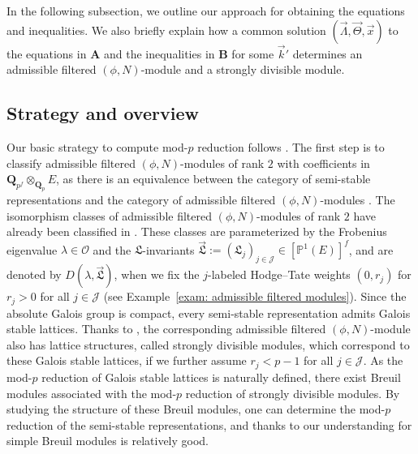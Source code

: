 \documentclass[11pt]{amsart}
\theoremstyle{definition}
\numberwithin{equation}{subsection}
\theoremstyle{plain}
\theoremstyle{plain}
\theoremstyle{plain}
\theoremstyle{plain}
\theoremstyle{plain}
\theoremstyle{plain}
\theoremstyle{plain}
\theoremstyle{plain}
\theoremstyle{plain}
\theoremstyle{plain}
\theoremstyle{plain}
\theoremstyle{plain}
\theoremstyle{definition}
\theoremstyle{definition}
\theoremstyle{definition}
\theoremstyle{remark}
\renewcommand{\(}{\textup{(}}
\renewcommand{\)}{\textup{)}}
\newcommand{\Q}{\mathbf{Q}}
\newcommand{\fL}{\mathfrak{L}}
\newcommand{\cO}{\mathcal{O}}
\newcommand{\cJ}{\mathcal{J}}
\newcommand{\vx}{\vec{x}}
\newcommand{\vL}{\vec{\fL}}
\newcommand{\vk}{\vec{k}}
\newcommand{\vLam}{\vec{\Lambda}}
\newcommand{\vTh}{\vec{\Theta}}
\begin{document}
In the following subsection, we outline our approach for obtaining the equations and inequalities. We also briefly explain how a common solution $(\vLam,\vTh,\vx)$ to the equations in \textbf{A} and the inequalities in \textbf{B} for some $\vk'$ determines an admissible filtered $(\phi,N)$-module and a strongly divisible module.



\subsection{Strategy and overview}
Our basic strategy to compute mod-$p$ reduction follows \cite{BM}. The first step is to classify admissible filtered $(\phi, N)$-modules of rank $2$ with coefficients in $\Q_{p^f} \otimes_{\Q_p} E$, as there is an equivalence between the category of semi-stable representations and the category of admissible filtered $(\phi, N)$-modules \cite{CF}. The isomorphism classes of admissible filtered $(\phi, N)$-modules of rank $2$ have already been classified in \cite{Dous}. These classes are parameterized by the Frobenius eigenvalue $\lambda \in \cO$ and the $\fL$-invariants $\vL := (\fL_j)_{j \in \cJ} \in [\mathbb{P}^1(E)]^f$, and are denoted by $D(\lambda, \vL)$, when we fix the $j$-labeled Hodge--Tate weights $(0,r_j)$ for $r_j>0$ for all $j\in\cJ$ (see Example~\ref{exam: admissible filtered modules}). Since the absolute Galois group is compact, every semi-stable representation admits Galois stable lattices. Thanks to \cite{Bre99, Liu}, the corresponding admissible filtered $(\phi, N)$-module also has lattice structures, called strongly divisible modules, which correspond to these Galois stable lattices, if we further assume $r_j<p-1$ for all $j\in\cJ$. As the mod-$p$ reduction of Galois stable lattices is naturally defined, there exist Breuil modules associated with the mod-$p$ reduction of strongly divisible modules. By studying the structure of these Breuil modules, one can determine the mod-$p$ reduction of the semi-stable representations, and thanks to \cite{Caruso} our understanding for simple Breuil modules is relatively good.
\end{document}
